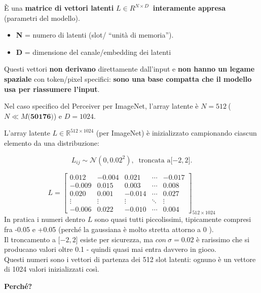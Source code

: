 \documentclass[
  11pt,
]{article}
\begin{document}
È una \textbf{matrice di vettori latenti} \(L \in R^{N \times D}\ \)
\textbf{interamente appresa} (parametri del modello).

\begin{itemize}
\item
  \textbf{N} = numero di latenti (slot/ ``unità di memoria'').
\item
  \textbf{D} = dimensione del canale/embedding dei latenti
\end{itemize}

Questi vettori \textbf{non derivano} direttamente dall'input e
\textbf{non hanno un legame spaziale} con token/pixel specifici:
\textbf{sono una base compatta che il modello usa per \textbf{riassumere}
l'input}.

Nel caso specifico del Perceiver per ImageNet, l'array
latente è \(N = 512\ \)(\(N \ll M(\mathbf{50176)}\)) e \(D = 1024\).

L'array latente \(L \in \mathbb{R}^{512 \times 1024}\)
(per ImageNet) è inizializzato campionando ciascun elemento da una
distribuzione:

\[L_{ij} \sim \mathcal{N}\left( 0,{0.02}^{2} \right),\ \text{ troncata a}\lbrack - 2,2\rbrack.\]

\[
L = \begin{bmatrix}
 0.012  & -0.004 &  0.021 & \cdots & -0.017 \\
-0.009  &  0.015 &  0.003 & \cdots &  0.008 \\
 0.020  &  0.001 & -0.014 & \cdots &  0.027 \\
\vdots  & \vdots & \vdots & \ddots & \vdots \\
-0.006  &  0.022 & -0.010 & \cdots &  0.004
\end{bmatrix}_{512 \times 1024}
\]In
pratica i numeri dentro \(L\) sono quasi tutti piccolissimi, tipicamente
compresi fra -0.05 e +0.05 (perché la gaussiana è molto stretta attorno
a 0 ).\\
Il troncamento a \(\lbrack - 2,2\rbrack\) esiste per sicurezza, ma
\(con\ \sigma = 0.02\) è rarissimo che si producano valori oltre 0.1 -
quindi quasi mai entra davvero in gioco.\\
Questi numeri sono i vettori di partenza dei 512 slot latenti: ognuno è
un vettore di 1024 valori inizializzati così.

\textbf{Perché?}
\end{document}
